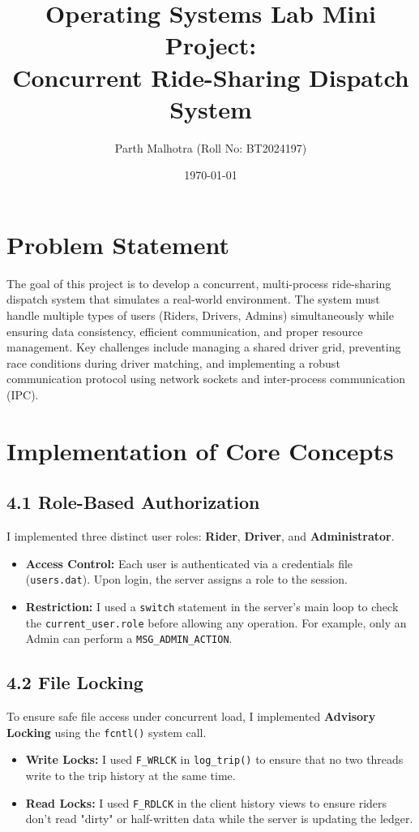 \documentclass[12pt]{article}
\title{Operating Systems Lab Mini Project: \\ Concurrent Ride-Sharing Dispatch System}
\author{Parth Malhotra (Roll No: BT2024197)}
\date{\today}
\begin{document}
\maketitle

\section{Problem Statement}
The goal of this project is to develop a concurrent, multi-process ride-sharing dispatch system that simulates a real-world environment. The system must handle multiple types of users (Riders, Drivers, Admins) simultaneously while ensuring data consistency, efficient communication, and proper resource management. Key challenges include managing a shared driver grid, preventing race conditions during driver matching, and implementing a robust communication protocol using network sockets and inter-process communication (IPC).

\section{Implementation of Core Concepts}

\subsection{4.1 Role-Based Authorization}
I implemented three distinct user roles: \textbf{Rider}, \textbf{Driver}, and \textbf{Administrator}.
\begin{itemize}
    \item \textbf{Access Control:} Each user is authenticated via a credentials file (\texttt{users.dat}). Upon login, the server assigns a role to the session.
    \item \textbf{Restriction:} I used a \texttt{switch} statement in the server's main loop to check the \texttt{current\_user.role} before allowing any operation. For example, only an Admin can perform a \texttt{MSG\_ADMIN\_ACTION}.
\end{itemize}

\subsection{4.2 File Locking}
To ensure safe file access under concurrent load, I implemented \textbf{Advisory Locking} using the \texttt{fcntl()} system call.
\begin{itemize}
    \item \textbf{Write Locks:} I used \texttt{F\_WRLCK} in \texttt{log\_trip()} to ensure that no two threads write to the trip history at the same time.
    \item \textbf{Read Locks:} I used \texttt{F\_RDLCK} in the client history views to ensure riders don't read "dirty" or half-written data while the server is updating the ledger.
\end{itemize}
\end{document}
